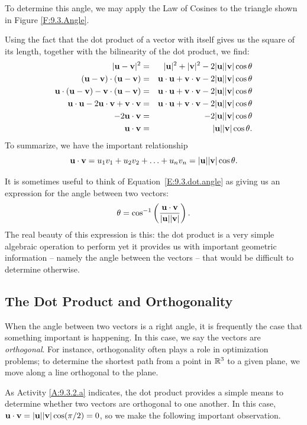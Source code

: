 To determine this angle, we may apply the Law of Cosines to the
triangle shown in Figure \ref{F:9.3.Angle}.  

Using the fact that the dot product of a vector with itself gives us
the square of its length, together with the bilinearity of the dot product, we find:
\begin{eqnarray*}
  |\mathbf{u}-\mathbf{v}|^2 & = & |\mathbf{u}|^2 + |\mathbf{v}|^2 - 2|\mathbf{u}||\mathbf{v}|\cos\theta \\
  (\mathbf{u}-\mathbf{v})\cdot(\mathbf{u}-\mathbf{v}) &=&
  \mathbf{u}\cdot\mathbf{u} + \mathbf{v}\cdot\mathbf{v} - 2|\mathbf{u}||\mathbf{v}|\cos\theta \\
  \mathbf{u}\cdot(\mathbf{u}-\mathbf{v}) - \mathbf{v}\cdot(\mathbf{u}-\mathbf{v})& = &
  \mathbf{u}\cdot\mathbf{u} + \mathbf{v}\cdot\mathbf{v} - 2|\mathbf{u}||\mathbf{v}|\cos\theta \\
  \mathbf{u}\cdot\mathbf{u} - 2\mathbf{u}\cdot\mathbf{v} + \mathbf{v}\cdot\mathbf{v} & = & 
  \mathbf{u}\cdot\mathbf{u} + \mathbf{v}\cdot\mathbf{v} - 2|\mathbf{u}||\mathbf{v}|\cos\theta \\
  -2\mathbf{u}\cdot\mathbf{v} & = & -2|\mathbf{u}||\mathbf{v}|\cos\theta \\
  \mathbf{u}\cdot\mathbf{v} & = & |\mathbf{u}||\mathbf{v}|\cos\theta.
\end{eqnarray*}
To summarize, we have the important relationship
\begin{equation}
  \mathbf{u}\cdot\mathbf{v} = u_1v_1+u_2v_2 + \ldots + u_nv_n =
  |\mathbf{u}||\mathbf{v}|\cos\theta.
  \label{E:9.3.dot.angle}
\end{equation}

It is sometimes useful to think of Equation~\eqref{E:9.3.dot.angle} as giving us an expression for
the angle between two vectors:
$$
\theta = \cos^{-1}\left(\frac{\mathbf{u}\cdot\mathbf{v}}{|\mathbf{u}||\mathbf{v}|}\right).
$$
The real beauty of this expression is this:  the dot product is a very
simple algebraic operation to perform yet it provides us with
important geometric information -- namely the angle between the vectors --
that would be difficult to determine otherwise.



\subsection*{The Dot Product and Orthogonality}

When the angle between two vectors is a right angle, it is frequently
the case that something important is happening.  In this case, we say the
vectors are {\em orthogonal}.  For instance, orthogonality often plays
a role in optimization problems; to determine the shortest path from a
point in $\mathbb{R}^3$ to a given plane, we move along a line orthogonal to
the plane.  

As Activity \ref{A:9.3.2.a} indicates, the dot product
provides a simple means to determine whether two vectors are
orthogonal to one another.  In this case,
$\mathbf{u}\cdot\mathbf{v}=|\mathbf{u}||\mathbf{v}|\cos(\pi/2) = 0$, so we make the following important observation.

